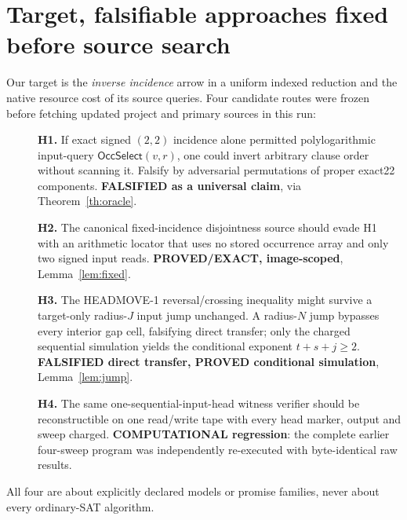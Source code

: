 \documentclass[11pt]{article}
\newcommand{\Sel}{\mathsf{OccSelect}}
\begin{document}
\section{Target, falsifiable approaches fixed before source search}
Our target is the \emph{inverse incidence} arrow in a uniform indexed reduction and the native resource cost of its source queries. Four candidate routes were frozen before fetching updated project and primary sources in this run:
\begin{description}
\item[] \textbf{H1.} If exact signed $(2,2)$ incidence alone permitted polylogarithmic input-query $\Sel(v,r)$, one could invert arbitrary clause order without scanning it.  Falsify by adversarial permutations of proper exact22 components. \textbf{FALSIFIED as a universal claim}, via Theorem~\ref{th:oracle}.
\item[] \textbf{H2.} The canonical fixed-incidence disjointness source should evade H1 with an arithmetic locator that uses no stored occurrence array and only two signed input reads. \textbf{PROVED/EXACT, image-scoped}, Lemma~\ref{lem:fixed}.
\item[] \textbf{H3.} The HEADMOVE-1 reversal/crossing inequality might survive a target-only radius-$J$ input jump unchanged.  A radius-$N$ jump bypasses every interior gap cell, falsifying direct transfer; only the charged sequential simulation yields the conditional exponent $t+s+j\ge2$. \textbf{FALSIFIED direct transfer, PROVED conditional simulation}, Lemma~\ref{lem:jump}.
\item[] \textbf{H4.} The same one-sequential-input-head witness verifier should be reconstructible on one read/write tape with every head marker, output and sweep charged.  \textbf{COMPUTATIONAL regression}: the complete earlier four-sweep program was independently re-executed with byte-identical raw results.
\end{description}
All four are about explicitly declared models or promise families, never about every ordinary-SAT algorithm.
\end{document}
